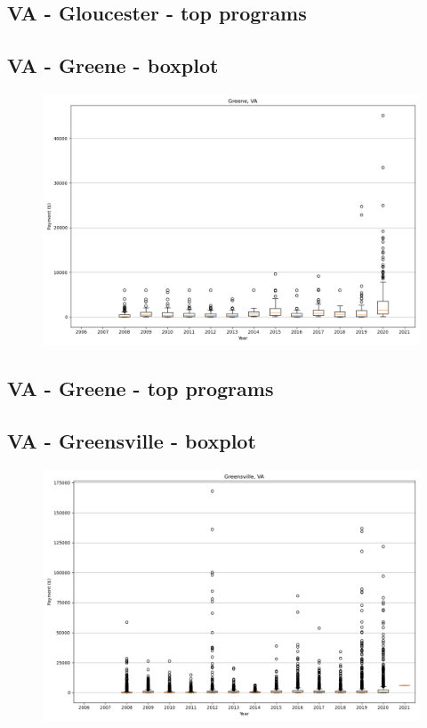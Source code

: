 \subsection*{VA - Gloucester - top programs}

\newpage
\subsection*{VA - Greene - boxplot}
\begin{figure}[h]
\centering
\includegraphics[width=7in]{../output/boxplots/counties/Greene-VA_boxplot.png}
\end{figure}


\subsection*{VA - Greene - top programs}

\newpage
\subsection*{VA - Greensville - boxplot}
\begin{figure}[h]
\centering
\includegraphics[width=7in]{../output/boxplots/counties/Greensville-VA_boxplot.png}
\end{figure}


